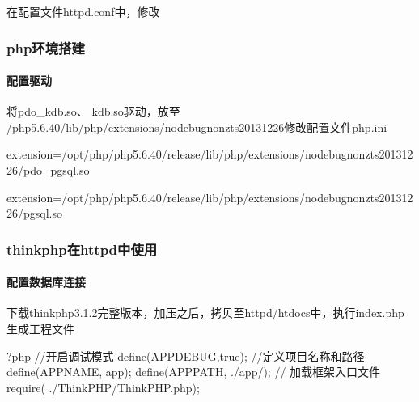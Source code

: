\documentclass[letterpaper,10pt,english]{sphinxmanual}
\begin{document}
在配置文件httpd.conf中，修改

\begin{sphinxVerbatim}[commandchars=\\\{\}]
 
\end{sphinxVerbatim}


\subsubsection{php环境搭建}
\label{\detokenize{interface/thinkPHP:php}}

\paragraph{配置驱动}
\label{\detokenize{interface/thinkPHP:id2}}
将pdo\_kdb.so、 kdb.so驱动，放至
/php\sphinxhyphen{}5.6.40/lib/php/extensions/no\sphinxhyphen{}debug\sphinxhyphen{}non\sphinxhyphen{}zts\sphinxhyphen{}20131226修改配置文件php.ini

extension=/opt/php/php\sphinxhyphen{}5.6.40/release/lib/php/extensions/no\sphinxhyphen{}debug\sphinxhyphen{}non\sphinxhyphen{}zts\sphinxhyphen{}20131226/pdo\_pgsql.so

extension=/opt/php/php\sphinxhyphen{}5.6.40/release/lib/php/extensions/no\sphinxhyphen{}debug\sphinxhyphen{}non\sphinxhyphen{}zts\sphinxhyphen{}20131226/pgsql.so


\subsubsection{thinkphp在httpd中使用}
\label{\detokenize{interface/thinkPHP:thinkphphttpd}}

\paragraph{配置数据库连接}
\label{\detokenize{interface/thinkPHP:id3}}
下载thinkphp3.1.2完整版本，加压之后，拷贝至httpd/htdocs中，执行index.php生成工程文件

\begin{sphinxVerbatim}[commandchars=\\\{\}]
\PYGZlt{}?php
//开启调试模式
define(\PYGZsq{}APP\PYGZus{}DEBUG\PYGZsq{},true);
//定义项目名称和路径
define(\PYGZsq{}APP\PYGZus{}NAME\PYGZsq{}, \PYGZsq{}app\PYGZsq{});
define(\PYGZsq{}APP\PYGZus{}PATH\PYGZsq{}, \PYGZsq{}./app/\PYGZsq{});
// 加载框架入口文件
require( \PYGZdq{}./ThinkPHP/ThinkPHP.php\PYGZdq{});
\end{sphinxVerbatim}
\end{document}
